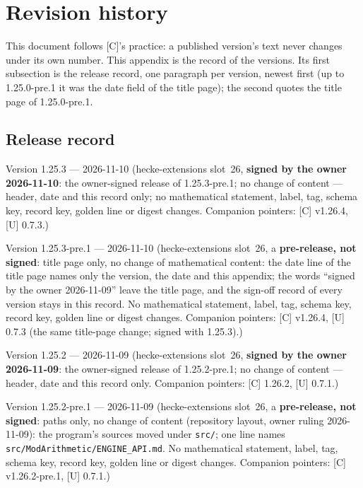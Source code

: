 \documentclass[11pt]{article}
\theoremstyle{remark}
\begin{document}
\raggedright
\section{Revision history}\label{app:history}
This document follows [C]'s practice: a published version's text never changes under its own number. This appendix is the
record of the versions. Its first subsection is the release record, one paragraph per version, newest first (up to
1.25.0-pre.1 it was the date field of the title page); the second quotes the title page of 1.25.0-pre.1.

\subsection{Release record}
Version 1.25.3 --- 2026-11-10 (hecke-extensions slot~26, \textbf{signed by the owner 2026-11-10}: the owner-signed release of 1.25.3-pre.1; no change of content --- header, date and this record only; no mathematical statement, label, tag, schema key, record key, golden line or digest changes. Companion pointers: [C] v1.26.4, [U] 0.7.3.)

Version 1.25.3-pre.1 --- 2026-11-10 (hecke-extensions slot~26, a \textbf{pre-release, not signed}: title page only, no change of mathematical content: the date line of the title page names only the version, the date and this appendix; the words ``signed by the owner 2026-11-09'' leave the title page, and the sign-off record of every version stays in this record. No mathematical statement, label, tag, schema key, record key, golden line or digest changes. Companion pointers: [C] v1.26.4, [U] 0.7.3 (the same title-page change; signed with 1.25.3).)

Version 1.25.2 --- 2026-11-09 (hecke-extensions slot~26, \textbf{signed by the owner 2026-11-09}: the owner-signed release of 1.25.2-pre.1; no change of content --- header, date and this record only. Companion pointers: [C] 1.26.2, [U] 0.7.1.)

Version 1.25.2-pre.1 --- 2026-11-09 (hecke-extensions slot~26, a \textbf{pre-release, not signed}: paths only, no change of content (repository layout, owner ruling 2026-11-09): the program's sources moved under \texttt{src/}; one line names \texttt{src/ModArithmetic/ENGINE\_API.md}. No mathematical statement, label, tag, schema key, record key, golden line or digest changes. Companion pointers: [C] v1.26.2-pre.1, [U] 0.7.1.)
\end{document}
